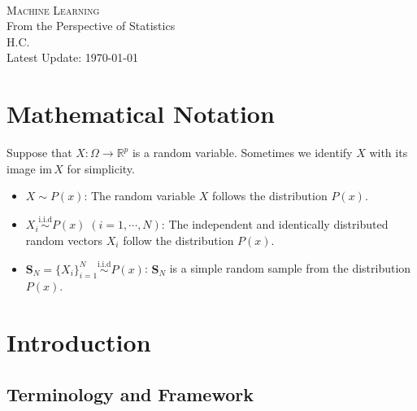 \documentclass{report}
\theoremstyle{nonumberplain}
\newcommand{\0}{\mathbf{0}}
\begin{document}
	\begin{center}	
	~\\ 
	\vspace{6em} 
	\textsc{\Huge Machine Learning}	
	~\\
	\vspace{2.5em} 
	{\Large From the Perspective of Statistics}
	~\\
	\vspace{6em}
	\textsf{H.C.}
	~\\
	\vspace{5in}  
	{\large Latest Update: \today}
	\end{center}


\chapter*{Mathematical Notation}
	Suppose that $X:\Omega\to\mathbb{R}^p$ is a random variable. Sometimes we identify $X$ with its image $\mathrm{im}\,X$ for simplicity.
\begin{itemize}
	\item $X\sim P(x)$: The random variable $X$ follows the distribution $P(x)$.
	\item $X_i\stackrel{\text{i.i.d}}{\sim}P(x)\;(i=1,\cdots,N)$: The independent and identically distributed random vectors $X_i$ follow the distribution $P(x)$. \item $\mathbf{S}_N=\{X_i\}_{i=1}^N\stackrel{\text{i.i.d}}{\sim}P(x)$: $\mathbf{S}_N$ is a simple random sample from the distribution $P(x)$.
\end{itemize}
\chapter{Introduction}

\section{Terminology and Framework}
\end{document}
